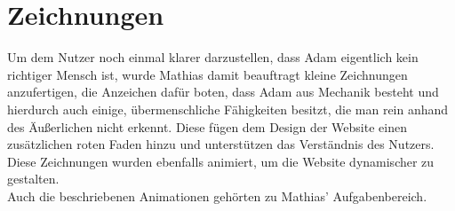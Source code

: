\section{Zeichnungen}
Um dem Nutzer noch einmal klarer darzustellen, dass Adam eigentlich kein richtiger Mensch ist, wurde Mathias damit beauftragt kleine Zeichnungen anzufertigen, die Anzeichen dafür boten, dass Adam aus Mechanik besteht und hierdurch auch einige, übermenschliche Fähigkeiten besitzt, die man rein anhand des Äußerlichen nicht erkennt. Diese fügen dem Design der Website einen zusätzlichen roten Faden hinzu und unterstützen das Verständnis des Nutzers. 
Diese Zeichnungen wurden ebenfalls animiert, um die Website dynamischer zu gestalten.\\ Auch die beschriebenen Animationen gehörten zu Mathias' Aufgabenbereich. 